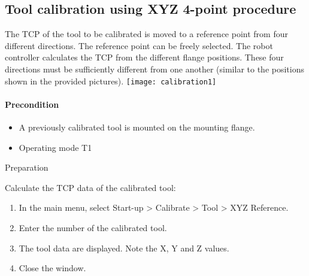 		\subsection{Tool calibration using XYZ 4-point procedure}
	
		
	

			The TCP of the tool to be calibrated is moved to a reference point from four different directions. The reference point can be freely selected. The robot controller calculates the TCP from the different flange positions. These four directions must be sufficiently different from one another (similar to the positions shown in the provided pictures).
\texttt{[image: calibration1]}

		
		\paragraph{Precondition}
		\begin{itemize}
			\item A previously calibrated tool is mounted on the mounting flange.
			\item Operating mode T1
		
		\end{itemize}
		
		Preparation
		
		Calculate the TCP data of the calibrated tool:
		\begin{enumerate}
			\item In the main menu, select Start-up > Calibrate > Tool > XYZ Reference.
			\item Enter the number of the calibrated tool.
			\item The tool data are displayed. Note the X, Y and Z values.
			\item Close the window.
		\end{enumerate}
		
